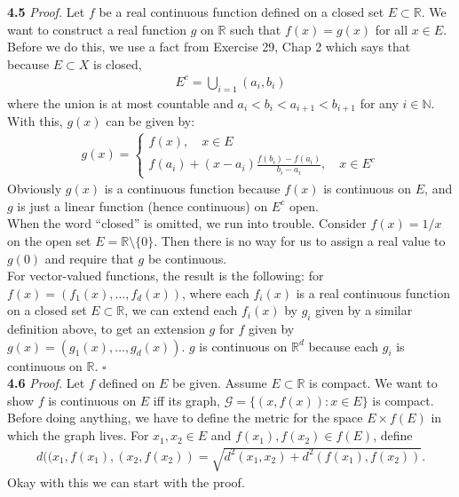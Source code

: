 \documentclass[11pt]{article}
\begin{document}
\noindent \textbf{4.5}  
\noindent \textit{Proof.}  Let $f$ be a real continuous function defined on a closed set $E \subset \mathbb{R}$. We want to construct a real function $g$ on $\mathbb{R}$ such that $f(x) = g(x)$ for all $x \in E$. Before we do this, we use a fact from Exercise 29, Chap 2 which says that because $E \subset X$ is closed,
\begin{align*}
E^c = \bigcup_{i=1}(a_i,b_i)
\end{align*}
where the union is at most countable and $a_i < b_i < a_{i+1} < b_{i+1}$ for any $i \in \mathbb{N}$. With this, $g(x)$ can be given by:
\begin{align*}
g(x) = \begin{cases}
f(x), \quad x \in E\\
f(a_i) + (x - a_i)\frac{f(b_i) - f(a_i)}{b_i - a_i}, \quad x \in E^c
\end{cases}
\end{align*}
Obviously $g(x)$ is a continuous function because $f(x)$ is continuous on $E$, and $g$ is just a linear function (hence continuous) on $E^c$ open. \\

When the word ``closed'' is omitted, we run into trouble. Consider $f(x) = 1/x$ on the open set $E = \mathbb{R} \setminus \{ 0\}$. Then there is no way for us to assign a real value to $g(0)$ and require that $g$ be continuous. \\

For vector-valued functions, the result is the following: for $f(x) = (f_1(x),\dots,f_d(x))$, where each $f_i(x)$ is a real continuous function on a closed set $E \subset \mathbb{R}$, we can extend each $f_i(x)$ by $g_i$ given by a similar definition above, to get an extension $g$ for $f$ given by $g(x) = (g_1(x),\dots,g_d(x))$. $g$ is continuous on $\mathbb{R}^d$ because each $g_i$ is continuous on $\mathbb{R}$.  \hfill $\square$\\


\noindent \textbf{4.6}   
\noindent \textit{Proof.} Let $f$ defined on $E$ be given. Assume $E \subset \mathbb{R}$ is compact. We want to show $f$ is continuous on $E$ iff its graph, $\mathcal{G} = \{ (x,f(x)): x\in E\}$ is compact.  \\

Before doing anything, we have to define the metric for the space $E\times f(E)$ in which the graph lives. For $x_1,x_2 \in E$ and $f(x_1), f(x_2) \in f(E)$, define
\begin{align*}
d((x_1,f(x_1),(x_2, f(x_2)) = \sqrt{d^2(x_1,x_2) + d^2(f(x_1), f(x_2))}.
\end{align*}
Okay with this we can start with the proof.\\
\end{document}
